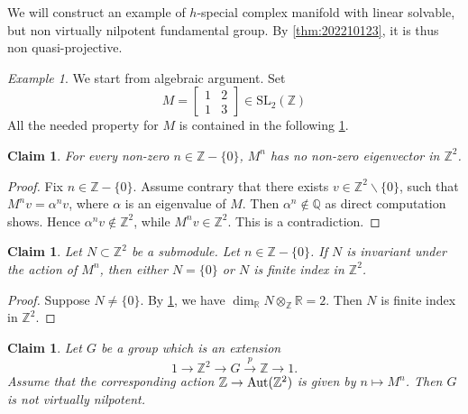\documentclass[11pt,english]{smfart}
\theoremstyle{plain}
\newtheorem{claim}[thm]{Claim}
\theoremstyle{definition}
\theoremstyle{remark}
\newtheorem{example}[thm]{Example}
\numberwithin{equation}{subsection}
\theoremstyle{plain}
\newcommand{\bZ}{\mathbb{Z}}
\begin{document}
We will construct an example of $h$-special complex manifold with linear solvable, but non virtually nilpotent fundamental group. By \cref{thm:202210123}, it is thus non quasi-projective.
\begin{example} 
	We start from algebraic argument.
	Set
	\begin{equation*}
		M=	\begin{bmatrix}
			1 & 2\\
			1 & 3
		\end{bmatrix}
		\in\mathrm{SL}_2(\mathbb Z)
	\end{equation*} 	
	All the needed property for $M$ is contained in the following \cref{claim:202210091}.
	
	\begin{claim}\label{claim:202210091}
		For every non-zero $n\in \mathbb Z-\{0\}$, $M^n$ has no non-zero eigenvector in $\mathbb Z^2$.
	\end{claim}
	
	\begin{proof}
		Fix $n\in \mathbb Z-\{0\}$.
		Assume contrary that there exists $v\in \mathbb Z^2\backslash \{ 0\}$, such that $M^nv=\alpha^nv$, where $\alpha$ is an eigenvalue of $M$.
		Then $\alpha^n\not\in\mathbb Q$ as direct computation shows. 
		Hence $\alpha^nv\not\in \mathbb Z^2$, while $M^nv\in\mathbb Z^2$.
		This is a contradiction.
	\end{proof}
	
	\begin{claim}\label{claim:202210092}
		Let $N\subset \mathbb Z^2$ be a submodule.
		Let $n\in \mathbb Z-\{0\}$.
		If $N$ is invariant under the action of $M^n$, then either $N=\{0\}$ or $N$ is finite index in $\mathbb Z^2$.
	\end{claim}
	
	\begin{proof}
		Suppose $N\not=\{0\}$.
		By \cref{claim:202210091}, we have $\dim_{\mathbb R}N\otimes_{\mathbb Z}\mathbb R=2$.
		Then $N$ is finite index in $\mathbb Z^2$.
	\end{proof}
	
	\begin{claim}\label{claim:202210093}
		Let $G$ be a group which is an extension 
		$$
		1\to \mathbb Z^2\to G\overset{p}{\to}\mathbb Z\to 1.
		$$
		Assume that the corresponding action $\mathbb Z\to {\rm Aut}(\bZ^2)$ is given by $n\mapsto M^n$.
		Then $G$ is not virtually nilpotent.
	\end{claim}
	

\end{example}
\end{document}
